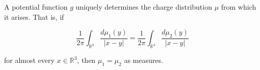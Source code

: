 A potential function $g$ uniquely determines the charge distribution $\mu$ from which it arises. That is, if

$$\frac{1}{2\pi} \int_{\mathbb{R}^3} \frac{d\mu_1(y)}{|x - y|} = \frac{1}{2\pi} \int_{\mathbb{R}^3} \frac{d\mu_2(y)}{|x - y|}$$

for almost every $x \in \mathbb{R}^3$, then $\mu_1 = \mu_2$ as measures.
